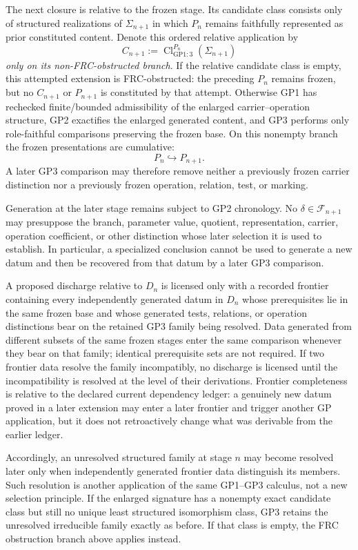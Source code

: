 \documentclass[12pt,a4paper]{article}
\begin{document}
\begin{definition}
The next closure is relative to the frozen stage.  Its candidate class consists
only of structured realizations of \(\Sigma_{n+1}\) in which \(P_n\) remains
faithfully represented as prior constituted content.  Denote this ordered
relative application by
\[
   C_{n+1}
   :=\operatorname{Cl}^{P_n}_{\mathrm{GP1:3}}(\Sigma_{n+1})
\]
\emph{only on its non-FRC-obstructed branch}.  If the relative candidate
class is empty, this attempted extension is FRC-obstructed: the preceding
\(P_n\) remains frozen, but no \(C_{n+1}\) or \(P_{n+1}\) is constituted
by that attempt.  Otherwise GP1 has rechecked finite/bounded admissibility
of the enlarged carrier--operation structure, GP2 exactifies the enlarged
generated content, and GP3 performs only role-faithful comparisons preserving
the frozen base.  On this nonempty branch the frozen presentations are
cumulative:
\[
   P_n\hookrightarrow P_{n+1}.
\]
A later GP3 comparison may therefore remove neither a previously frozen carrier
distinction nor a previously frozen operation, relation, test, or marking.

Generation at the later stage remains subject to GP2 chronology.  No
\(\delta\in\mathcal F_{n+1}\) may presuppose the branch, parameter value,
quotient, representation, carrier, operation coefficient, or other distinction
whose later selection it is used to establish.  In particular, a specialized
conclusion cannot be used to generate a new datum and then be recovered from
that datum by a later GP3 comparison.

A proposed discharge relative to \(D_n\) is licensed only with a recorded
frontier containing every independently generated datum in \(D_n\) whose
prerequisites lie in the same frozen base and whose generated tests, relations,
or operation distinctions bear on the retained GP3 family being resolved.
Data generated from different subsets of the same frozen stages enter the same
comparison whenever they bear on that family; identical prerequisite sets are
not required.  If two frontier data resolve the family incompatibly, no
discharge is licensed until the incompatibility is resolved at the level of
their derivations.  Frontier completeness is relative to the declared current
dependency ledger: a genuinely new datum proved in a later extension may enter
a later frontier and trigger another GP application, but it does not
retroactively change what was derivable from the earlier ledger.

Accordingly, an unresolved structured family at stage \(n\) may become
resolved later only when independently generated frontier data distinguish its
members.  Such resolution is another application of the same GP1--GP3
calculus, not a new selection principle.  If the enlarged signature has a nonempty exact candidate class but still
no unique least structured isomorphism class, GP3 retains the unresolved
irreducible family exactly as before.  If that class is empty, the FRC
obstruction branch above applies instead.
\end{definition}
\end{document}
